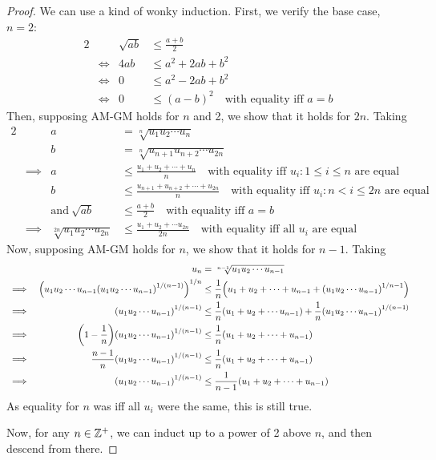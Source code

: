 \begin{proof}
We can use a kind of wonky induction. First, we verify the base
case, \(n = 2\):
\begin{alignat*}{2}
&&\sqrt{ab} &\le \frac{a + b}{2} \\
&\iff& 4ab &\le a^2 + 2ab + b^2 \\
&\iff& 0 &\le a^2 - 2ab + b^2 \\
&\iff& 0 &\le (a - b)^2\quad \text{with equality iff \(a = b\)}
\end{alignat*}
Then, supposing AM-GM holds for \(n\) and 2, we show that it holds for
\(2n\).  Taking
\begin{alignat*}{2}
&&a &= \sqrt[n]{u_1 u_2 \dotsm u_n} \\
&&b &= \sqrt[n]{u_{n+1} u_{n+2} \dotsm u_{2n}} \\
&\implies& a &\le \frac{u_1 + u_2 + \dotsb + u_n}{n}
        \quad \text{with equality iff \(u_i: 1 \le i \le n\) are equal}\\
&&b &\le \frac{u_{n + 1} + u_{n + 2} + \dotsb + u_{2n}}{n}
        \quad \text{with equality iff \(u_i: n < i \le 2n\) are equal}\\
&&\text{and}\ \sqrt{ab} &\le \frac{a + b}{2}
    \quad \text{with equality iff \(a = b\)}\\
&\implies& \sqrt[2n]{u_1 u_2 \dotsm u_{2n}} &\le
         \frac{u_1 + u_2 + \dotsb u_{2n}}{2n}
            \quad \text{with equality iff all \(u_i\) are equal}
\end{alignat*}
Now, supposing AM-GM holds for \(n\), we show that it holds for \(n - 1\).
Taking
\begin{alignat*}{2}
&&u_n &= \sqrt[n - 1]{u_1 u_2 \dotsm u_{n - 1}} \\
&\implies& \pqty{u_1 u_2 \dotsm u_{n - 1}
            \pqty{u_1 u_2 \dotsm u_{n - 1}}^{1 / (n - 1)}}^{1 / n}
         &\le \frac 1n \pqty{u_1 + u_2 + \dotsb  + u_{n - 1} +
            \pqty{u_1 u_2 \dotsm u_{n - 1}}^{1/{n - 1}}} \\
&\implies& \pqty{u_1 u_2 \dotsm u_{n - 1}}^{1 / (n - 1)} &\le
         \frac 1n \pqty{u_1 + u_2 + \dotsb u_{n - 1}} +
         \frac 1n \pqty{u_1 u_2 \dotsm u_{n - 1}}^{1 / (n - 1)} \\
&\implies& \pqty{1 - \frac 1n}
         \pqty{u_1 u_2 \dotsm u_{n - 1}}^{1 / (n - 1)} &\le
         \frac 1n \pqty{u_1 + u_2 + \dotsb + u_{n - 1}} \\
&\implies& \frac {n - 1}n
         \pqty{u_1 u_2 \dotsb u_{n - 1}}^{1 / (n - 1)} &\le
         \frac 1n \pqty{u_1 + u_2 + \dotsb + u_{n - 1}} \\
&\implies& \pqty{u_1 u_2 \dotsm u_{n - 1}}^{1 / (n - 1)} &\le
         \frac 1{n - 1} \pqty{u_1 + u_2 + \dotsb + u_{n - 1}}
\end{alignat*}
As equality for \(n\) was iff all \(u_i\) were the same, this is still true.

Now, for any \(n \in \mathbb Z^+\), we can induct up to a power of 2 above
\(n\), and then descend from there.
\end{proof}

